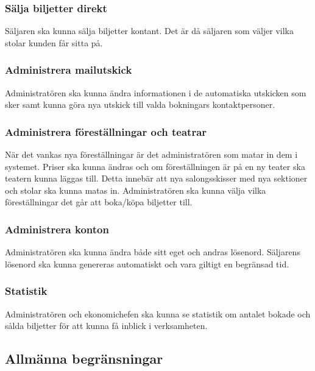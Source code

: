 \documentclass[a4paper, twoside, 11pt, titlepage]{article}
\begin{document}
		\subsubsection{Sälja biljetter direkt}


		Säljaren ska kunna sälja biljetter kontant. Det är då säljaren som väljer vilka stolar kunden får sitta på.

		\subsubsection{Administrera mailutskick}


		Administratören ska kunna ändra informationen i de automatiska utskicken som sker samt kunna göra nya utskick till valda bokningars kontaktpersoner.

		\subsubsection{Administrera föreställningar och teatrar}


		När det vankas nya föreställningar är det administratören som matar in dem i systemet. Priser ska kunna ändras och om föreställningen är på en ny teater ska teatern kunna läggas till. Detta innebär att nya salongsskisser med nya sektioner och stolar ska kunna matas in. Administratören ska kunna välja vilka föreställningar det går att boka/köpa biljetter till.

		\subsubsection{Administrera konton}


		Administratören ska kunna ändra både sitt eget och andras lösenord. Säljarens lösenord ska kunna genereras automatiskt och vara giltigt en begränsad tid.

		\subsubsection{Statistik}


		Administratören och ekonomichefen ska kunna se statistik om antalet bokade och sålda biljetter för att kunna få inblick i verksamheten.

	\subsection{Allmänna begränsningar}
\end{document}
